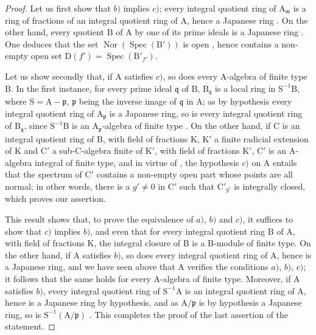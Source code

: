 \begin{proof}
Let us first show that $b)$ implies $c)$; every integral quotient ring of $\mathrm{A}_\mathfrak{m}$ is a ring of fractions of an integral quotient ring of $\mathrm{A}$, hence a Japanese ring . On the other hand, every quotient $\mathrm{B}$ of $\mathrm{A}$ by one of its prime ideals is a Japanese ring . One deduces that the set $\operatorname{Nor}(\operatorname{Spec}(\mathrm{B}'))$ is open , hence contains a non-empty open set $\mathrm{D}(f')=\operatorname{Spec}(\mathrm{B}'_{f'})$.


Let us show secondly that, if $\mathrm{A}$ satisfies $c)$, so does every $\mathrm{A}$-algebra of finite type $\mathrm{B}$. In the first instance, for every prime ideal $\mathfrak{q}$ of $\mathrm{B}$, $\mathrm{B}_\mathfrak{q}$ is a local ring in $\mathrm{S}^{-1}\mathrm{B}$, where $\mathrm{S}=\mathrm{A}-\mathfrak{p}$, $\mathfrak{p}$ being the inverse image of $\mathfrak{q}$ in $\mathrm{A}$; as by hypothesis every integral quotient ring of $\mathrm{A}_\mathfrak{p}$ is a Japanese ring, so is every integral quotient ring of $\mathrm{B}_\mathfrak{q}$, since $\mathrm{S}^{-1}\mathrm{B}$ is an $\mathrm{A}_\mathfrak{p}$-algebra of finite type . On the other hand, if $\mathrm{C}$ is an integral quotient ring of $\mathrm{B}$, with field of fractions $\mathrm{K}$, $\mathrm{K}'$ a finite radicial extension of $\mathrm{K}$ and $\mathrm{C}'$ a sub-$\mathrm{C}$-algebra finite of $\mathrm{K}'$, with field of fractions $\mathrm{K}'$, $\mathrm{C}'$ is an $\mathrm{A}$-algebra integral of finite type, and in virtue of , the hypothesis $c)$ on $\mathrm{A}$ entails that the spectrum of $\mathrm{C}'$ contains a non-empty open part whose points are all normal; in other words, there is a $g'\neq 0$ in $\mathrm{C}'$ such that $\mathrm{C}'_{g'}$ is integrally closed, which proves our assertion.

This result shows that, to prove the equivalence of $a)$, $b)$ and $c)$, it suffices to show that $c)$ implies $b)$, and even that for every integral quotient ring $\mathrm{B}$ of $\mathrm{A}$, with field of fractions $\mathrm{K}$, the integral closure of $\mathrm{B}$ is a $\mathrm{B}$-module of finite type. On the other hand, if $\mathrm{A}$ satisfies $b)$, so does every integral quotient ring of $\mathrm{A}$, hence is a Japanese ring, and we have seen above that $\mathrm{A}$ verifies the conditions $a)$, $b)$, $c)$; it follows that the same holds for every $\mathrm{A}$-algebra of finite type. Moreover, if $\mathrm{A}$ satisfies $b)$, every integral quotient ring of $\mathrm{S}^{-1}\mathrm{A}$ is an integral quotient ring of $\mathrm{A}$, hence is a Japanese ring by hypothesis, and as $\mathrm{A}/\mathfrak{p}$ is by hypothesis a Japanese ring, so is $\mathrm{S}^{-1}(\mathrm{A}/\mathfrak{p})$ . This completes the proof of the last assertion of the statement.
\end{proof}

